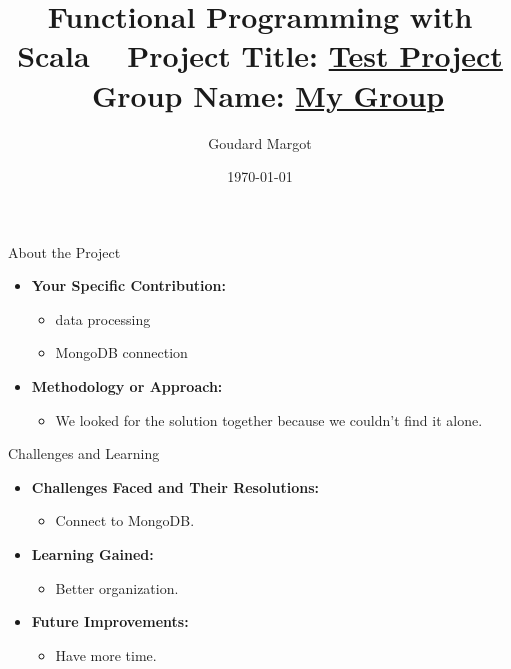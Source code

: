 \documentclass[serif, aspectratio=169]{beamer}
\title[Project Presentation]{Functional Programming with Scala \ { \large Project Title: \underline{ Test Project \hspace{2cm}}}\ {\small Group Name: \underline{ My Group \hspace{2cm} }}}
\author{Goudard Margot}
\institute{ IG5_Polytech}
\date{\small \today}
\begin{document}
\begin{frame}
    \titlepage
\end{frame}

\begin{frame}{About the Project}
    \begin{itemize}
        \item \textbf{Your Specific Contribution:}
        \begin{itemize}
            \item data processing
            \item MongoDB connection
        \end{itemize}
        \medskip
        \item \textbf{Methodology or Approach:}
        \begin{itemize}
            \item We looked for the solution together because we couldn't find it alone.
        \end{itemize}

    \end{itemize}
\end{frame}

\begin{frame}{Challenges and Learning}
    \begin{itemize}
        \item \textbf{Challenges Faced and Their Resolutions:}
        \begin{itemize}
            \item Connect to MongoDB.

        \end{itemize}
        \medskip
        \item \textbf{Learning Gained:}
        \begin{itemize}
            \item Better organization.
        \end{itemize}
        \medskip
        \item \textbf{Future Improvements:}
        \begin{itemize}
            \item Have more time.
        \end{itemize}
    \end{itemize}
\end{frame}
\end{document}
